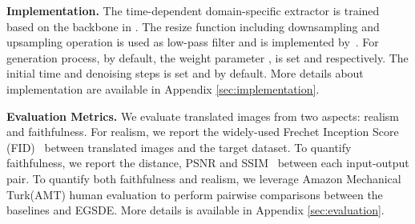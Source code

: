 \documentclass{article}
\begin{document}
\textbf{Implementation.} The time-dependent domain-specific extractor  is trained based on the backbone in \cite{dhariwal2021diffusion}. The resize function including downsampling and upsampling operation is used as low-pass filter and is implemented by~\cite{ResizeRight}. For generation process, by default, the weight parameter ,  is set   and  respectively. The initial time  and denoising steps  is set  and  by default. More details about implementation are available in Appendix \ref{sec:implementation}.

\textbf{Evaluation Metrics.} We evaluate translated images from two aspects: realism and faithfulness. For realism, we report the widely-used Frechet Inception Score (FID)~\cite{heusel2017gans} between translated images and the target dataset. To quantify faithfulness, we report the  distance, PSNR and SSIM~\cite{wang2004image} between each input-output pair. To quantify both faithfulness and realism, we leverage Amazon Mechanical Turk(AMT) human evaluation to perform pairwise comparisons between the baselines and EGSDE. More details is available in Appendix \ref{sec:evaluation}.  
\end{document}
